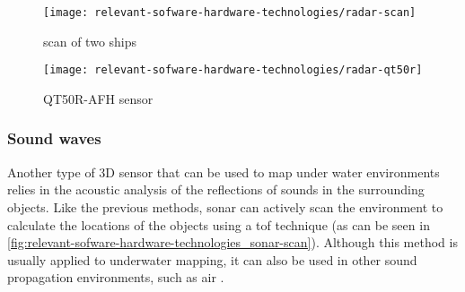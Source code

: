 \begin{savenotes}
\begin{figure}[H]
	\centering
	\begin{minipage}[h]{.47\textwidth}
		\centering
		\texttt{[image: relevant-sofware-hardware-technologies/radar-scan]}
		\caption[ scan of two ships]{ scan of two ships\protect\footnotemark}
		\label{fig:relevant-sofware-hardware-technologies_radar-scan}
	\end{minipage}\hfill
	\begin{minipage}[h]{.47\textwidth}
		\centering
		\texttt{[image: relevant-sofware-hardware-technologies/radar-qt50r]}
		\caption[QT50R-AFH  sensor]{QT50R-AFH  sensor\protect\footnotemark}
		\label{fig:relevant-sofware-hardware-technologies_radar-qt50r}
	\end{minipage}
\end{figure}
\end{savenotes}



\subsubsection{Sound waves}

Another type of 3D sensor that can be used to map under water environments relies in the acoustic analysis of the reflections of sounds in the surrounding objects. Like the previous methods, \gls{sonar} can actively scan the environment to calculate the locations of the objects using a \gls{tof} technique (as can be seen in \cref{fig:relevant-sofware-hardware-technologies_sonar-scan}). Although this method is usually applied to underwater mapping, it can also be used in other sound propagation environments, such as air \cite{Guarato2013}.

